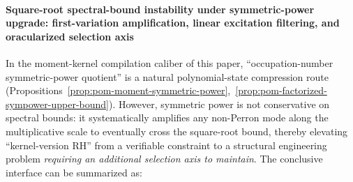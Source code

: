 \paragraph{Square-root spectral-bound instability under symmetric-power upgrade: first-variation amplification, linear excitation filtering, and oracularized selection axis}
In the moment-kernel compilation caliber of this paper, ``occupation-number symmetric-power quotient'' is a natural polynomial-state compression route (Propositions~\ref{prop:pom-moment-symmetric-power},~\ref{prop:pom-factorized-sympower-upper-bound}).
However, symmetric power is not conservative on spectral bounds: it systematically amplifies any non-Perron mode along the multiplicative scale to eventually cross the square-root bound, thereby elevating ``kernel-version RH'' from a verifiable constraint to a structural engineering problem \emph{requiring an additional selection axis to maintain}. The conclusive interface can be summarized as:

